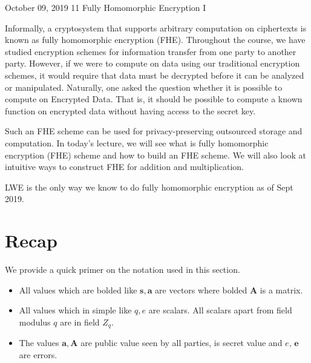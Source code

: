 \documentclass[usletter]{article}
\begin{document}
    
           {October 09, 2019}                          %
           {11}                                       %
           {Fully Homomorphic Encryption I}  %

\newcommand{\floor}[1]{\left\lfloor #1 \right\rfloor}
\newcommand{\ceil}[1]{\left\lceil #1 \right\rceil}

Informally, a cryptosystem that supports arbitrary computation on ciphertexts is known as fully homomorphic encryption (FHE)\cite{wiki}. Throughout the course, we have studied encryption schemes for information transfer from one party to another party. However, if we were to compute on data using our traditional encryption schemes, it would require that data must be decrypted before it can be analyzed or manipulated. Naturally, one asked the question whether it is possible to compute on Encrypted Data. That is, it should be possible to compute a known function on encrypted data without having access to the secret key. 

Such an FHE scheme can be used for privacy-preserving outsourced storage and computation. In today's lecture, we will see what is fully homomorphic encryption (FHE) scheme and how to build an FHE scheme. We will also look at intuitive ways to construct FHE for addition and multiplication.

\begin{fact}
LWE is the only way we know to do fully homomorphic encryption as of Sept 2019. 
\end{fact}
           
\section{Recap}

We provide a quick primer on the notation used in this section. 
\begin{itemize}
    \item All values which are bolded like $\pmb{s}, \pmb{a}$ are vectors where bolded $\pmb{A}$ is a matrix.
    \item All values which in simple like $q, e$ are scalars. All scalars apart from field modulus $q$ are in field $Z_q$.
    \item The values $\pmb{a}, \pmb{A}$ are public value seen by all parties,  is secret value and $e$, $\pmb{e}$ are errors.
\end{itemize}
\end{document}
